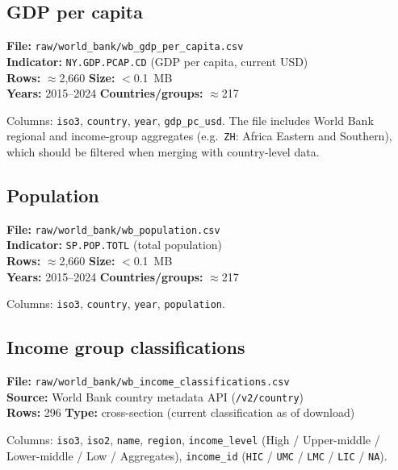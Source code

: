 \documentclass[11pt,a4paper]{article}
\begin{document}
\subsection{GDP per capita}

\textbf{File:} \texttt{raw/world\_bank/wb\_gdp\_per\_capita.csv}\\
\textbf{Indicator:} \texttt{NY.GDP.PCAP.CD} (GDP per capita, current USD)\\
\textbf{Rows:} $\approx$2{,}660 \quad \textbf{Size:} $<$0.1~MB\\
\textbf{Years:} 2015--2024 \quad \textbf{Countries/groups:} $\approx$217

\noindent Columns: \texttt{iso3}, \texttt{country}, \texttt{year}, \texttt{gdp\_pc\_usd}.  The file includes World Bank regional and income-group aggregates (e.g.\ \texttt{ZH}: Africa Eastern and Southern), which should be filtered when merging with country-level data.

\subsection{Population}

\textbf{File:} \texttt{raw/world\_bank/wb\_population.csv}\\
\textbf{Indicator:} \texttt{SP.POP.TOTL} (total population)\\
\textbf{Rows:} $\approx$2{,}660 \quad \textbf{Size:} $<$0.1~MB\\
\textbf{Years:} 2015--2024 \quad \textbf{Countries/groups:} $\approx$217

\noindent Columns: \texttt{iso3}, \texttt{country}, \texttt{year}, \texttt{population}.

\subsection{Income group classifications}

\textbf{File:} \texttt{raw/world\_bank/wb\_income\_classifications.csv}\\
\textbf{Source:} World Bank country metadata API (\texttt{/v2/country})\\
\textbf{Rows:} 296 \quad \textbf{Type:} cross-section (current classification as of download)

\noindent Columns: \texttt{iso3}, \texttt{iso2}, \texttt{name}, \texttt{region}, \texttt{income\_level} (High / Upper-middle / Lower-middle / Low / Aggregates), \texttt{income\_id} (\texttt{HIC} / \texttt{UMC} / \texttt{LMC} / \texttt{LIC} / \texttt{NA}).
\end{document}
